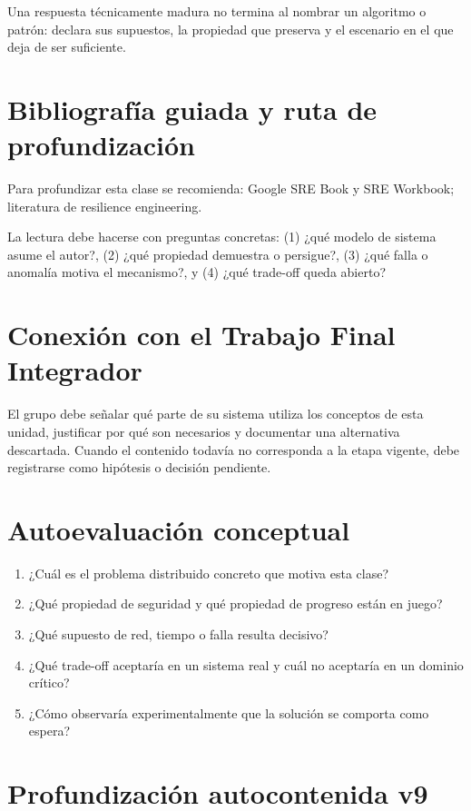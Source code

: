 \documentclass[variant=apuntes,cover=institutional,mode=screen]{ua-engineering-v6-article}
\begin{document}
\begin{uakeybox}
Una respuesta técnicamente madura no termina al nombrar un algoritmo o patrón: declara sus supuestos, la propiedad que preserva y el escenario en el que deja de ser suficiente.
\end{uakeybox}

\section{Bibliografía guiada y ruta de profundización}
Para profundizar esta clase se recomienda: Google SRE Book y SRE Workbook; literatura de resilience engineering.

La lectura debe hacerse con preguntas concretas: (1) ¿qué modelo de sistema asume el autor?, (2) ¿qué propiedad demuestra o persigue?, (3) ¿qué falla o anomalía motiva el mecanismo?, y (4) ¿qué trade-off queda abierto?

\section{Conexión con el Trabajo Final Integrador}
El grupo debe señalar qué parte de su sistema utiliza los conceptos de esta unidad, justificar por qué son necesarios y documentar una alternativa descartada. Cuando el contenido todavía no corresponda a la etapa vigente, debe registrarse como hipótesis o decisión pendiente.

\section{Autoevaluación conceptual}
\begin{enumerate}
\item ¿Cuál es el problema distribuido concreto que motiva esta clase?
\item ¿Qué propiedad de seguridad y qué propiedad de progreso están en juego?
\item ¿Qué supuesto de red, tiempo o falla resulta decisivo?
\item ¿Qué trade-off aceptaría en un sistema real y cuál no aceptaría en un dominio crítico?
\item ¿Cómo observaría experimentalmente que la solución se comporta como espera?
\end{enumerate}

\section{Profundización autocontenida v9}
\end{document}
